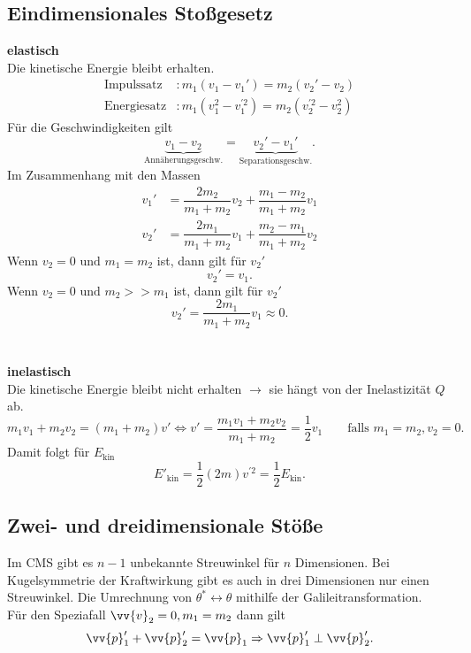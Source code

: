 \documentclass[a4paper,12pt]{article}
\numberwithin{equation}{section}
\begin{document}
\subsection{Eindimensionales Stoßgesetz}
\textbf{elastisch}\\
Die kinetische Energie bleibt erhalten.
\begin{align*}
        \text{Impulssatz}&:m_1\left(v_1-v_1'\right)=m_2\left(v_2'-v_2\right)\\
        \text{Energiesatz}&:m_1\left(v_1^2-v_1^{'2}\right)=m_2\left(v_2^{'2}-v_2^2\right)
\end{align*}
Für die Geschwindigkeiten gilt
\[ 
        \underbrace{v_1-v_2}_{\text{Annäherungsgeschw.}}=\underbrace{v_2'-v_1'}_{\text{Separationsgeschw.}}
.\] 
Im Zusammenhang mit den Massen
\begin{align*}
        v_1'&=\dfrac{2m_2}{m_1+m_2}v_2+\dfrac{m_1-m_2}{m_1+m_2}v_1\\
        v_2'&=\dfrac{2m_1}{m_1+m_2}v_1+\dfrac{m_2-m_1}{m_1+m_2}v_2
\end{align*}
Wenn $v_2=0\text{ und }m_1=m_2$ ist, dann gilt für $v_2'$ 
\[ 
        v_2'=v_1
.\] 
Wenn $v_2=0\text{ und }m_2>>m_1$ ist, dann gilt für $v_2'$ 
\[ 
        v_2'=\dfrac{2m_1}{m_1+m_2}v_1\approx 0
.\] 
\\\hfill\\\textbf{inelastisch}\\ 
Die kinetische Energie bleibt nicht erhalten $\rightarrow $ sie hängt von der Inelastizität $Q$ ab. 
\[ 
        m_1v_1+m_2v_2=\left(m_1+m_2\right)v'\Leftrightarrow v'=\dfrac{m_1v_1+m_2v_2}{m_1+m_2}=\dfrac{1}{2}v_1\qquad \text{falls }m_1=m_2,v_2=0
.\] 
Damit folgt für $E_{\text{kin}}$ 
\[ 
        E'_{\text{kin}}=\dfrac{1}{2}\left(2m\right)v^{'2}=\dfrac{1}{2}E_{\text{kin}}
.\] 

\subsection{Zwei- und dreidimensionale Stöße}
Im CMS gibt es $n-1$ unbekannte Streuwinkel für $n$ Dimensionen. Bei Kugelsymmetrie der Kraftwirkung gibt es auch in drei Dimensionen nur einen Streuwinkel. Die Umrechnung von $\theta ^{*}\leftrightarrow \theta $ mithilfe der Galileitransformation.\\Für den Speziafall $\vv{v}_2=0,m_1=m_2$ dann gilt
\[ 
        \vv{p}_1'+\vv{p}_2'=\vv{p}_1\Rightarrow \vv{p}_1'\perp\vv{p}_2'
.\] 
\end{document}
